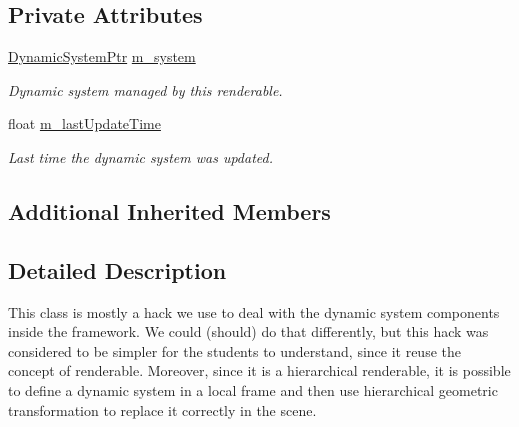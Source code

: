 \subsection*{Private Attributes}
\begin{DoxyCompactItemize}
\item 
\hyperlink{DynamicSystem_8hpp_a682a5f32e97dba69e8a4e542ed98b419}{Dynamic\+System\+Ptr} \hyperlink{classDynamicSystemRenderable_a49be4db93a0d7e1122278c9d0dac43f2}{m\+\_\+system}
\begin{DoxyCompactList}\small\item\em Dynamic system managed by this renderable. \end{DoxyCompactList}\item 
float \hyperlink{classDynamicSystemRenderable_a4f1e45c9b781ffc21b63dcf211991d10}{m\+\_\+last\+Update\+Time}
\begin{DoxyCompactList}\small\item\em Last time the dynamic system was updated. \end{DoxyCompactList}\end{DoxyCompactItemize}
\subsection*{Additional Inherited Members}


\subsection{Detailed Description}
This class is mostly a hack we use to deal with the dynamic system components inside the framework. We could (should) do that differently, but this hack was considered to be simpler for the students to understand, since it reuse the concept of renderable. Moreover, since it is a hierarchical renderable, it is possible to define a dynamic system in a local frame and then use hierarchical geometric transformation to replace it correctly in the scene. 

